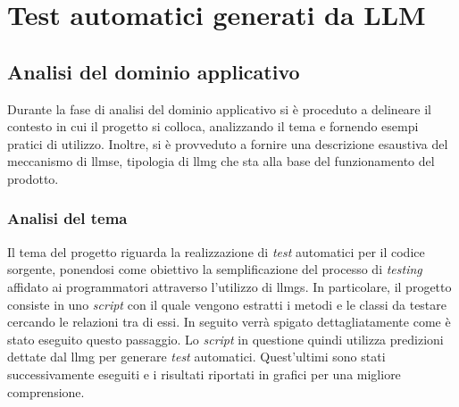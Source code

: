 \chapter{Test automatici generati da LLM}
\label{chap:descrizione-stage-1}
\section{Analisi del dominio applicativo}
Durante la fase di analisi del dominio applicativo si è proceduto a delineare il contesto in cui il progetto si colloca, analizzando il tema e fornendo esempi pratici di utilizzo. Inoltre, si è provveduto a fornire una descrizione esaustiva del meccanismo di \gls{llmse}\glox, tipologia di \gls{llmg} che sta alla base del funzionamento del prodotto.
    \subsection{Analisi del tema}
    Il tema del progetto riguarda la realizzazione di \textit{test} automatici per il codice sorgente, ponendosi come obiettivo la semplificazione del processo di \textit{testing} affidato ai programmatori attraverso l'utilizzo di \glspl{llmg}.
    In particolare, il progetto consiste in uno \textit{script} con il quale vengono estratti i metodi e le classi da testare cercando le relazioni tra di essi. In seguito verrà spigato dettagliatamente come è stato eseguito questo passaggio.
    Lo \textit{script} in questione quindi utilizza predizioni dettate dal \gls{llmg} per generare \textit{test} automatici. Quest'ultimi sono stati successivamente eseguiti e i risultati riportati in grafici per una migliore comprensione.  



